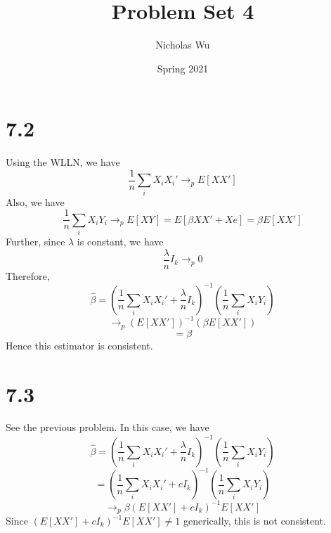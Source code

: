 \documentclass[10pt,letter]{article}
\begin{document}


\title{Problem Set 4}

\author{Nicholas Wu}

\date{Spring 2021}

\maketitle


\section*{7.2}
Using the WLLN, we have
\[ \frac{1}{n}\sum_{i} X_i X_i' \to_p E[XX'] \]
Also, we have
\[ \frac{1}{n}\sum_i X_i Y_i \to_p E[XY] = E[\beta XX' + Xe] = \beta E[XX'] \]
Further, since $\lambda$ is constant, we have
\[ \frac{\lambda}{n} I_k \to_p 0 \]
Therefore,
\[ \hat{\beta} = \left(\frac{1}{n}\sum_{i} X_i X_i' + \frac{\lambda}{n} I_k \right)^{-1}\left(\frac{1}{n}\sum_i X_i Y_i \right) \]
\[ \to_p (E[XX'])^{-1}(\beta E[XX']) \]
\[ = \beta \]
Hence this estimator is consistent.
\section*{7.3}
See the previous problem. In this case, we have
\[ \hat{\beta} = \left(\frac{1}{n}\sum_{i} X_i X_i' + \frac{\lambda}{n} I_k \right)^{-1}\left(\frac{1}{n}\sum_i X_i Y_i \right) \]
\[ = \left(\frac{1}{n}\sum_{i} X_i X_i' + c I_k \right)^{-1}\left(\frac{1}{n}\sum_i X_i Y_i \right) \]
\[ \to_p \beta (E[XX'] + cI_k)^{-1}E[XX'] \]
Since $(E[XX'] + cI_k)^{-1}E[XX'] \neq 1$ generically, this is not consistent.
\end{document}
